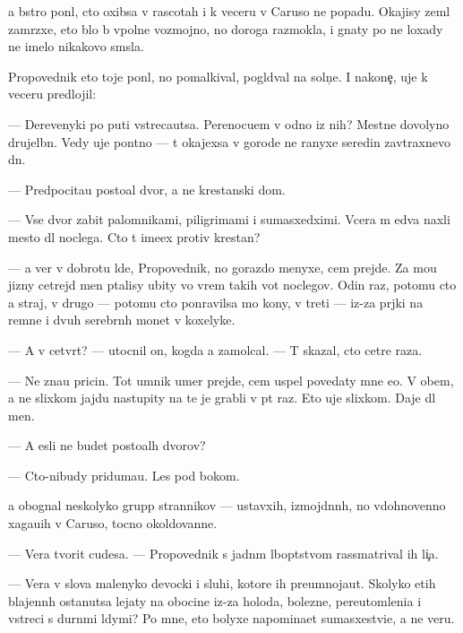 \documentclass[10pt]{book}
\begin{document}
{\Y}a b{\yi}stro pon{\ia}l, cto oxibsa v rascotah i k veceru v Caruso ne popadu. Okajisy zeml{\ia} zam{\e}rzxe{\y}, eto b{\yi}lo b{\yi} vpolne vozmojno, no doroga razmokla, i gnaty po ne{\y} loxady ne imelo nikakovo sm{\yi}sla.

Pro\-po\-ved\-nik eto toje pon{\ia}l, no pomalkival, pogl{\ia}d{\yi}val na soln{\c}e. I na\-ko\-ne{\c}, uje k veceru predlojil:

— Derevenyki po puti vstreca{\y}utsa. Perenocu{\y}em v odno{\y} iz nih? Mestn{\yi}{\y}e dovolyno drujel{\io}bn{\yi}. Vedy uje pon{\ia}tno — t{\yi} okajexsa v gorode ne ranyxe seredin{\yi} zavtraxnevo dn{\ia}.

— Predpocita{\y}u posto{\y}al{\yi}{\y} dvor, a ne krest{\y}anski{\y} dom.

— Vse dvor{\yi} zabit{\yi} palomnikami, piligrimami i sumasxedximi. Vcera m{\yi} {\y}edva naxli mesto dl{\ia} noclega. Cto t{\yi} ime{\y}ex protiv krest{\y}an?

— {\Y}a ver{\io} v dobrotu l{\io}de{\y}, Pro\-po\-ved\-nik, no gorazdo menyxe, cem prejde. Za mo{\y}u jizny cet{\yi}rejd{\yi} men{\ia} p{\yi}talisy ubity vo vrem{\ia} takih vot noclegov. Odin raz, potomu cto {\y}a straj, v drugo{\y} — potomu cto ponravilsa mo{\y} kony, v treti{\y} — iz-za pr{\ia}jki na remne i dvuh serebr{\ia}n{\yi}h monet v koxelyke.

— A v cetv{\e}rt{\yi}{\y}? — utocnil on, kogda {\y}a zamolcal. — T{\yi} skazal, cto cet{\yi}re raza.

— Ne zna{\y}u pricin{\yi}. Tot umnik umer prejde, cem uspel povedaty mne {\y}e{\y}o. V ob{\x}em, {\y}a ne slixkom jajdu nastupity na te je grabli v p{\ia}t{\yi}{\y} raz. Eto uje slixkom. Daje dl{\ia} men{\ia}.

— A {\y}esli ne budet posto{\y}al{\yi}h dvorov?

— Cto-nibudy priduma{\y}u. Les pod bokom.

{\Y}a obognal neskolyko grupp strannikov — ustavxih, izmojd{\e}nn{\yi}h, no vdoh\-no\-ven\-no xaga{\y}u{\x}ih v Caruso, tocno okoldovann{\yi}{\y}e.

— Vera tvorit cudesa. — Pro\-po\-ved\-nik s jadn{\yi}m l{\io}bop{\yi}tstvom rassmatrival ih li{\c}a.

— Vera v slova malenyko{\y} devocki i sluhi, ko\-to\-r{\yi}\-{\y}e ih preumnoja{\y}ut. Skolyko etih blajenn{\yi}h ostanutsa lejaty na obocine iz-za holoda, bolezne{\y}, pereutomleni{\y}a i vstreci s durn{\yi}mi l{\io}dymi? Po mne, eto bolyxe napomina{\y}et sumasxestvi{\y}e, a ne veru.
\end{document}
